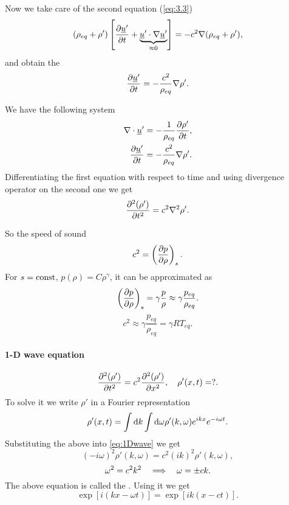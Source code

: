 \documentclass[11pt,oneside]{book}
\renewcommand{\vec}[1]{\underline{#1}}
\theoremstyle{definition} %
\theoremstyle{plain} %
\theoremstyle{remark} %
\theoremstyle{underline}
\begin{document}
  Now we take care of the second equation (\ref{eq:3.3})
  \begin{displaymath}
    (\rho_{eq} + \rho') \left[ \ptf{\vec u'}{t} + \underbrace{\vec u' \cdot \nabla \vec u'}_{\approx 0} \right] = - c^2 \nabla (\rho_{eq} + \rho'),
  \end{displaymath}
  and obtain the 
  \begin{displaymath}
    \ptf{\vec u'}{t} = - \frac{c^2}{\rho_{eq}} \nabla \rho'.
  \end{displaymath}

  We have the following system
  \begin{align*}
    \nabla \cdot \vec u' = - \frac{1}{\rho_{eq}} \ptf{\rho'}{t}, \\
    \ptf{\vec u'}{t} = - \frac{c^2}{\rho_{eq}} \nabla \rho'.
  \end{align*}
  Differentiating the first equation with respect to time and using divergence operator on the second one we get
  \begin{displaymath}
    \frac{\partial^2 (\rho')}{\partial t ^ 2} = c^2 \nabla^2 \rho'.
  \end{displaymath}

  So the speed of sound
  \begin{displaymath}
    c^2 = \left( \frac{\partial p}{\partial \rho} \right)_s.
  \end{displaymath}
  For $s = \textrm{const}$, $p(\rho) = C \rho^\gamma$, it can be approximated as
  \begin{displaymath}
    \left( \frac{\partial p}{\partial \rho} \right)_s = \gamma \frac{p}{\rho} \approx \gamma\frac{p_{eq}}{\rho_{eq}}.
  \end{displaymath}
  \begin{displaymath}
    c^2 \approx \gamma \frac{p_{eq}}{\rho_{eq}} = \gamma R T_{eq}.
  \end{displaymath}
  

  \paragraph{1-D wave equation}
  \begin{equation}
    \frac{\partial^2 (\rho')}{\partial t ^ 2} = c^2 \frac{\partial^2 (\rho')}{\partial x ^ 2}, \quad \rho'(x, t) = ?.
    \label{eq:1Dwave}
  \end{equation}
  To solve it we write $\rho'$ in a Fourier representation
  \begin{displaymath}
    \rho'(x,t) = \int\mathrm{d} k \int \mathrm{d} \omega \rho'(k, \omega) e^{ik x} e^{-i\omega t}.
  \end{displaymath}
  Substituting the above into \ref{eq:1Dwave} we get
  \begin{displaymath}
    (- i \omega) ^2 \rho'(k, \omega) = c^2 (i k)^2 \rho'(k,\omega),
  \end{displaymath}
  \begin{displaymath}
    \omega^2 = c^2 k^2 \quad \Longrightarrow \quad \omega = \pm c k.
  \end{displaymath}
  The above equation is called the .
  Using it we get
  \begin{displaymath}
    \exp\left[ i (k x - \omega t) \right] = \exp\left[ i k (x - c t)\right].
  \end{displaymath}
\end{document}
